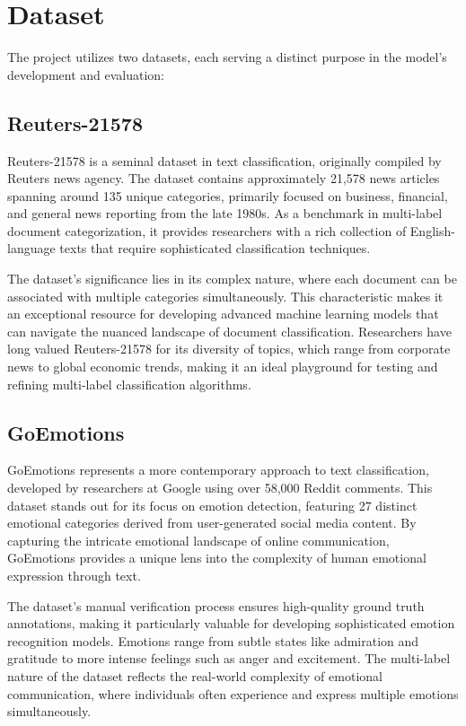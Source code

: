 \documentclass{article}
\begin{document}
\section{Dataset}
The project utilizes two datasets, each serving a distinct purpose in the model's development and evaluation:
\subsection{Reuters-21578}
Reuters-21578 is a seminal dataset in text classification, originally compiled by Reuters news agency. The dataset contains approximately 21,578 news articles spanning around 135 unique categories, primarily focused on business, financial, and general news reporting from the late 1980s. As a benchmark in multi-label document categorization, it provides researchers with a rich collection of English-language texts that require sophisticated classification techniques.

The dataset's significance lies in its complex nature, where each document can be associated with multiple categories simultaneously. This characteristic makes it an exceptional resource for developing advanced machine learning models that can navigate the nuanced landscape of document classification. Researchers have long valued Reuters-21578 for its diversity of topics, which range from corporate news to global economic trends, making it an ideal playground for testing and refining multi-label classification algorithms.

\subsection{GoEmotions}
GoEmotions represents a more contemporary approach to text classification, developed by researchers at Google using over 58,000 Reddit comments. This dataset stands out for its focus on emotion detection, featuring 27 distinct emotional categories derived from user-generated social media content. By capturing the intricate emotional landscape of online communication, GoEmotions provides a unique lens into the complexity of human emotional expression through text.

The dataset's manual verification process ensures high-quality ground truth annotations, making it particularly valuable for developing sophisticated emotion recognition models. Emotions range from subtle states like admiration and gratitude to more intense feelings such as anger and excitement. The multi-label nature of the dataset reflects the real-world complexity of emotional communication, where individuals often experience and express multiple emotions simultaneously.
\end{document}

